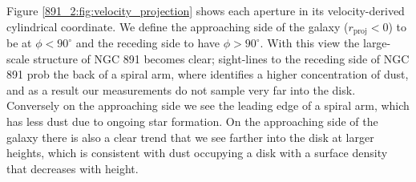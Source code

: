 




Figure \ref{891_2:fig:velocity_projection} shows each aperture in its
velocity-derived cylindrical coordinate. We define the approaching
side of the galaxy ($r_\mathrm{proj} < 0$) to be at $\phi <
90^{\circ}$ and the receding side to have $\phi > 90^{\circ}$. With
this view the large-scale structure of NGC 891 becomes clear;
sight-lines to the receding side of NGC 891 prob the back of a spiral
arm, where \citet{Kamphuis07b} identifies a higher concentration of
dust, and as a result our measurements do not sample very far into the
disk. Conversely on the approaching side we see the leading edge of a
spiral arm, which has less dust due to ongoing star formation. On the
approaching side of the galaxy there is also a clear trend that we see
farther into the disk at larger heights, which is consistent with dust
occupying a disk with a surface density that decreases with height.


